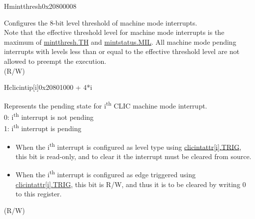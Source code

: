 \begin{register}{H}{mintthresh}{0x20800008}\label{regdesc:MINTTHRESH}
%
%
\regnewline%
\begin{regdesc}\begin{reglist}
\label{fielddesc:MINTTHRESH_TH}\item [TH] Configures the 8-bit level threshold of machine mode interrupts. \\
Note that the effective threshold level for machine mode interrupts is the maximum of \hyperref[fielddesc:MINTTHRESH_TH]{{mintthresh.TH}} and \hyperref[fielddesc:MINTSTATUS_MIL]{{mintstatus.MIL}}. All machine mode pending interrupts with levels less than or equal to the effective threshold level are not allowed to preempt the execution.\\(R/W)
\end{reglist}\end{regdesc}
\end{register}

\begin{register}{H}{{clicintip[i]}}{0x20801000 + 4*i}\label{regdesc:MCLICINTIP_REG_i}
%
%
\regnewline%
\begin{regdesc}
\begin{reglist}
\label{fielddesc:MCLICINTIP_i}\item [{IP[i]}] Represents the pending state for i\textsuperscript{th} CLIC machine mode interrupt. \\
0: i\textsuperscript{th} interrupt is not pending \\
1: i\textsuperscript{th} interrupt is pending \\
\begin{itemize}
    \item When the i\textsuperscript{th} interrupt is configured as level type using \hyperref[fielddesc:MCLICINTATTR_i_TRIG]{clicintattr[i].TRIG}, this bit is read-only, and to clear it the interrupt must be cleared from source.
    \item When the i\textsuperscript{th} interrupt is configured as edge triggered using \hyperref[fielddesc:MCLICINTATTR_i_TRIG]{clicintattr[i].TRIG}, this bit is R/W, and thus it is to be cleared by writing 0 to this register.
\end{itemize}
(R/W)
\end{reglist}
\end{regdesc}
\end{register}

